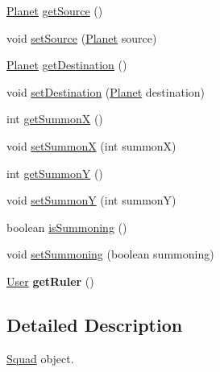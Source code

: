 \begin{DoxyCompactItemize}
\item 
\hyperlink{classfr_1_1groupe40_1_1projet_1_1model_1_1planets_1_1_planet}{Planet} \hyperlink{classfr_1_1groupe40_1_1projet_1_1model_1_1ships_1_1_squad_a12e9417052015e2c3044096372cadc2f}{get\+Source} ()
\item 
void \hyperlink{classfr_1_1groupe40_1_1projet_1_1model_1_1ships_1_1_squad_a748fbe03fce93a59390d5d61b663de53}{set\+Source} (\hyperlink{classfr_1_1groupe40_1_1projet_1_1model_1_1planets_1_1_planet}{Planet} source)
\item 
\hyperlink{classfr_1_1groupe40_1_1projet_1_1model_1_1planets_1_1_planet}{Planet} \hyperlink{classfr_1_1groupe40_1_1projet_1_1model_1_1ships_1_1_squad_a0549670e981d1ed577dec3e84045b00d}{get\+Destination} ()
\item 
void \hyperlink{classfr_1_1groupe40_1_1projet_1_1model_1_1ships_1_1_squad_a7d622ac0b8ba3ec378ca5dd47c7b6dbb}{set\+Destination} (\hyperlink{classfr_1_1groupe40_1_1projet_1_1model_1_1planets_1_1_planet}{Planet} destination)
\item 
int \hyperlink{classfr_1_1groupe40_1_1projet_1_1model_1_1ships_1_1_squad_a7cffe0e2640eae0fff70b9b5b43988e7}{get\+SummonX} ()
\item 
void \hyperlink{classfr_1_1groupe40_1_1projet_1_1model_1_1ships_1_1_squad_a955c5bdf17a95f1dd4a4475bc7426064}{set\+SummonX} (int summonX)
\item 
int \hyperlink{classfr_1_1groupe40_1_1projet_1_1model_1_1ships_1_1_squad_a1957d0d7169c10681d14ade61d8d54ac}{get\+SummonY} ()
\item 
void \hyperlink{classfr_1_1groupe40_1_1projet_1_1model_1_1ships_1_1_squad_a01a24bb024e2c708d192d07f7d89b118}{set\+SummonY} (int summonY)
\item 
boolean \hyperlink{classfr_1_1groupe40_1_1projet_1_1model_1_1ships_1_1_squad_a01723d42948743eb312fdd8ee95eb98d}{is\+Summoning} ()
\item 
void \hyperlink{classfr_1_1groupe40_1_1projet_1_1model_1_1ships_1_1_squad_a5be215f7c74369e01957d51ca5b1e89c}{set\+Summoning} (boolean summoning)
\item 
\mbox{\label{classfr_1_1groupe40_1_1projet_1_1model_1_1ships_1_1_squad_a38e7cd0ba4ab8456d9773028cbdad254}} 
\hyperlink{classfr_1_1groupe40_1_1projet_1_1client_1_1_user}{User} {\bfseries get\+Ruler} ()
\end{DoxyCompactItemize}


\subsection{Detailed Description}
\hyperlink{classfr_1_1groupe40_1_1projet_1_1model_1_1ships_1_1_squad}{Squad} object. 

